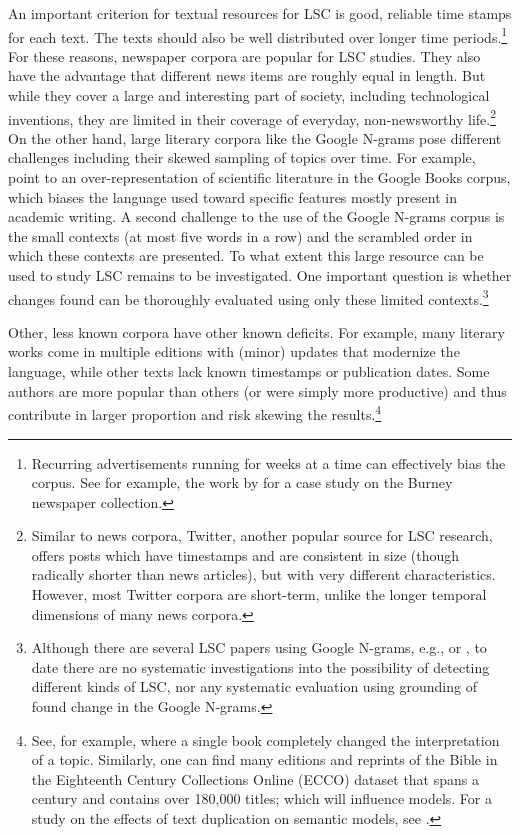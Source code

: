 \documentclass[output=paper]{langscibook}
\begin{document}
An important criterion for textual resources for LSC is good, reliable time stamps for each text. The texts should also be well distributed over longer time periods.\footnote{Recurring advertisements running for weeks at a time can effectively bias the corpus. See for example, the work by \citet[][67]{prescott2018searching} for a case study on the Burney newspaper collection.}  
For these reasons, newspaper corpora are popular for LSC studies. They also have the advantage that different news items are roughly equal in length.
But while they cover a large and interesting part of society, including technological inventions, they are limited in their coverage of everyday, non-newsworthy life.\footnote{Similar to news corpora, Twitter, another popular source for LSC research, offers posts which have timestamps and are consistent in size (though radically shorter than news articles), but with very different characteristics. However, most Twitter corpora are short-term, unlike the longer temporal dimensions of many news corpora.} 
On the other hand, large literary corpora like the Google N-grams pose different challenges including their skewed sampling of topics over time. For example, \citet{pechenick-etal-2015} point to an over-representation of scientific literature in the Google Books corpus, which biases the language used toward specific features mostly present in academic writing. 
A second challenge to the use of the Google N-grams corpus is the small contexts (at most five words in a row) and the scrambled order in which these contexts are presented. To what extent this large resource can be used to study LSC remains to be investigated. One important question is whether changes found can be thoroughly evaluated using only these limited contexts.\footnote{Although there are several LSC papers using Google N-grams, e.g., \citet{wijaya2011understanding} or \citet{gulordava-baroni-2011-distributional}, to date there are no systematic investigations into the possibility of detecting different kinds of LSC, nor any systematic evaluation using grounding of found change in the Google N-grams.}

Other, less known corpora have other known deficits. For example, many literary works come in multiple editions with (minor) updates that modernize the language, while other texts lack known timestamps or publication dates. Some authors are more popular than others (or were simply more productive) and thus contribute in larger proportion and risk skewing the results.\footnote{See, for example, \citet{tangherlini2013trawling} where a single book completely changed the interpretation of a topic. Similarly, one can find many editions and reprints of the Bible in the Eighteenth Century Collections Online (ECCO) dataset that spans a century and contains over 180,000 titles; which will influence models. For a study on the effects of text duplication on semantic models, see \citet{schofield-etal-2017-quantifying}.}
\end{document}
